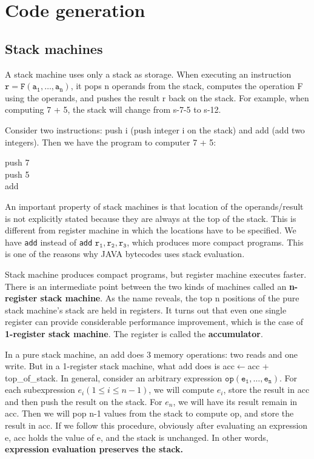 \ifx\PREAMBLE\undefined


\fi
\chapter{Code generation}
\section{Stack machines}
A stack machine uses only a stack as storage. When executing an instruction $\mathtt{r = F(a_1,\dots,a_n)}$, it pops n operands from the stack, computes the operation F using the operands, and pushes the result r back on the stack. For example, when computing 7 + 5, the stack will change from s-7-5 to s-12. 

Consider two instructions: push i (push integer i on the stack) and add (add two integers). Then we have the program to computer 7 + 5:
\begin{center}
push 7\\push 5\\add
\end{center}
An important property of stack machines is that location of the operands/result is not explicitly stated because they are always at the top of the stack. This is different from register machine in which the locations have to be specified. We have \texttt{add} instead of \texttt{add} $\mathtt{r_1, r_2, r_3}$, which produces more compact programs. This is one of the reasons why JAVA bytecodes uses stack evaluation.

Stack machine produces compact programs, but register machine executes faster. There is an intermediate point between the two kinds of machines called an \textbf{n-register stack machine}. As the name reveals, the top n positions of the pure stack machine's stack are held in registers. It turns out that even one single register can provide considerable performance improvement, which is the case of \textbf{1-register stack machine}. The register is called the \textbf{accumulator}. 

In a pure stack machine, an add does 3 memory operations: two reads and one write. But in a 1-register stack machine, what add does is acc$\leftarrow$acc + top\_of\_stack. In general, consider an arbitrary expression $\mathtt{op(e_1,\dots,e_n)}$. For each subexpression $e_i(1\leq i\leq n-1)$, we will compute $e_i$, store the result in acc and then push the result on the stack. For $e_n$, we will have its result remain in acc. Then we will pop n-1 values from the stack to compute op, and store the result in acc. If we follow this procedure, obviously after evaluating an expression e, acc holds the value of e, and the stack is unchanged. In other words, \textbf{expression evaluation preserves the stack.}

